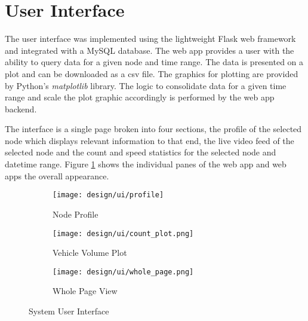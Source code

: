 \section{User Interface}

The user interface was implemented using the lightweight Flask web framework and integrated with a MySQL database. The web app provides a user with the ability to query data for a given node and time range. The data is presented on a plot and can be downloaded as a csv file. The graphics for plotting are provided by Python's \emph{matplotlib} library. The logic to consolidate data for a given time range and scale the plot graphic accordingly is performed by the web app backend.

The interface is a single page broken into four sections, the profile of the selected node which displays relevant information to that end, the live video feed of the selected node and the count and speed statistics for the selected node and datetime range. Figure \ref{fig:dragonfly} shows the individual panes of the web app and web apps the overall appearance.

\begin{figure}[H]
	\centering
    \begin{subfigure}[b]{0.45\linewidth}
        \centering\texttt{[image: design/ui/profile]}
        \caption{Node Profile}
    \end{subfigure}
    \begin{subfigure}[b]{0.45\linewidth}
        \centering\texttt{[image: design/ui/count\_plot.png]}
        \caption{Vehicle Volume Plot}
    \end{subfigure}
    \begin{subfigure}[b]{0.45\linewidth}
        \centering\texttt{[image: design/ui/whole\_page.png]}
        \caption{Whole Page View}
    \end{subfigure}
    	\caption{System User Interface}
    	\label{fig:dragonfly}
\end{figure}


